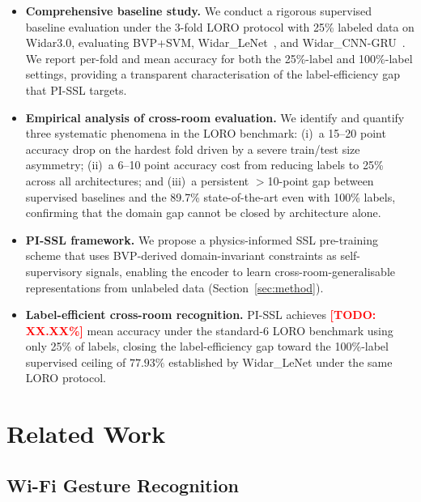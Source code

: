 \documentclass[journal]{IEEEtran}
\newcommand{\todo}[1]{\textcolor{red}{\textbf{[TODO: #1]}}}
\begin{document}
\begin{itemize}[leftmargin=*]

  \item \textbf{Comprehensive baseline study.}
  We conduct a rigorous supervised baseline evaluation under the
  3-fold LORO protocol with 25\% labeled data on Widar3.0,
  evaluating BVP+SVM, Widar\_LeNet~\cite{ma2023sensefi}, and
  Widar\_CNN-GRU~\cite{ma2023sensefi}.
  We report per-fold and mean accuracy for both the 25\%-label and
  100\%-label settings, providing a transparent characterisation of
  the label-efficiency gap that PI-SSL targets.

  \item \textbf{Empirical analysis of cross-room evaluation.}
  We identify and quantify three systematic phenomena in the LORO
  benchmark: (i)~a 15--20 point accuracy drop on the hardest fold
  driven by a severe train/test size asymmetry; (ii)~a 6--10 point
  accuracy cost from reducing labels to 25\% across all architectures;
  and (iii)~a persistent $>$10-point gap between supervised baselines
  and the 89.7\% state-of-the-art even with 100\% labels, confirming
  that the domain gap cannot be closed by architecture alone.

  \item \textbf{PI-SSL framework.}
  We propose a physics-informed SSL pre-training scheme that uses
  BVP-derived domain-invariant constraints as self-supervisory signals,
  enabling the encoder to learn cross-room-generalisable representations
  from unlabeled data (Section~\ref{sec:method}).

  \item \textbf{Label-efficient cross-room recognition.}
  PI-SSL achieves \todo{XX.XX\%} mean accuracy under the standard-6
  LORO benchmark using only 25\% of labels, closing the
  label-efficiency gap toward the 100\%-label supervised ceiling of
  $77.93\%$ established by Widar\_LeNet under the same LORO protocol.

\end{itemize}

\section{Related Work}
\label{sec:related}

\subsection{Wi-Fi Gesture Recognition}
\label{sec:related:wifi}
\end{document}
